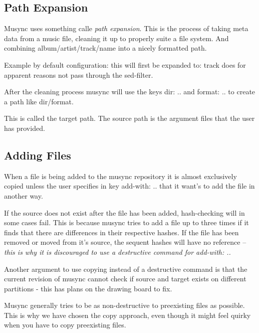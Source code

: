 \subsection{Path Expansion}
Musync uses something calle \emph{path expansion}.
This is the process of taking meta data from a music file, cleaning it up to properly suite a file system.
And combining album/artist/track/name into a nicely formatted path.

Example by default configuration:
this will first be expanded to:
track does for apparent reasons not pass through the sed-filter.

After the cleaning process musync will use the keys dir: .. and format: .. to create a path like dir/format.

This is called the target path. The source path is the argument files that the user has provided. 

\subsection{Adding Files}
When a file is being added to the musync repository it is almost exclusively copied unless the user specifies in key add-with: .. that it want's to add the file in another way.

If the source does not exist after the file has been added, hash-checking will in some cases fail. This is because musync tries to add a file up to three times if it finds that there are differences in their respective hashes. If the file has been removed or moved from it's source, the sequent hashes will have no reference -- \emph{this is why it is discouraged to use a destructive command for add-with: ..}

Another argument to use copying instead of a destructive command is that the current revision of musync cannot check if source and target exists on different partitions - this has plans on the drawing board to fix.

Musync generally tries to be as non-destructive to preexisting files as possible. This is why we have chosen the copy approach, even though it might feel quirky when you have to copy preexisting files. 

